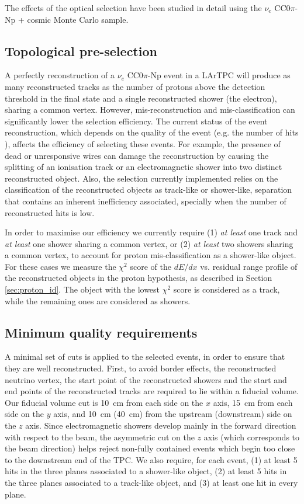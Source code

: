 The effects of the optical selection have been studied in detail using the $\nu_{e}$ CC0$\pi$-Np + cosmic Monte Carlo sample.

\subsection{Topological pre-selection} \label{sec:topological_pre_selection}
A perfectly reconstruction of a $\nu_{e}$ CC0$\pi$-Np event in a LArTPC will produce as many reconstructed tracks as the number of protons above the detection threshold in the final state and a single reconstructed shower (the electron), sharing a common vertex. However, mis-reconstruction and mis-classification can significantly lower the selection efficiency. The current status of the event reconstruction, which depends on the quality of the event (e.g. the number of hits \cite{Acciarri:2017hat}), affects the efficiency of selecting these events. For example, the presence of dead or unresponsive wires can damage the reconstruction by causing the splitting of an ionisation track or an electromagnetic shower into two distinct reconstructed object. Also, the selection currently implemented relies on the classification of the reconstructed objects as track-like or shower-like, separation that contains an inherent inefficiency associated, specially when the number of reconstructed hits is low.

In order to maximise our efficiency we currently require (1) \emph{at least} one track and \emph{at least} one shower sharing a common vertex, or (2) \emph{at least} two showers sharing a common vertex, to account for proton mis-classification as a shower-like object. For these cases we measure the $\chi^2$ score of the $dE/dx$ vs. residual range profile of the reconstructed objects in the proton hypothesis, as described in Section \ref{sec:proton_id}. The object with the lowest $\chi^2$ score is considered as a track, while the remaining ones are considered as showers.

\subsection{Minimum quality requirements}\label{sec:precuts}
A minimal set of cuts is applied to the selected events, in order to ensure that they are well reconstructed.
First, to avoid border effects, the reconstructed neutrino vertex, the start point of the reconstructed showers and the start and end points of the reconstructed tracks are required to lie within a fiducial volume. Our fiducial volume cut is 10~cm from each side on the $x$ axis, 15~cm from each side on the $y$ axis, and 10~cm (40~cm) from the upstream (downstream) side on the $z$ axis. 
Since electromagnetic showers develop mainly in the forward direction with respect to the beam, the asymmetric cut on the $z$ axis (which corresponds to the beam direction) helps reject non-fully contained events which begin too close to the downstream end of the TPC.
We also require, for each event, (1) at least 5 hits in the three planes associated to a shower-like object, (2) at least 5 hits in the three planes associated to a track-like object, and (3) at least one hit in every plane.


